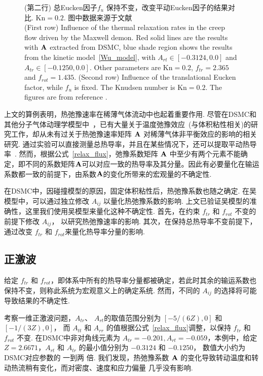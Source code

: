 \begin{figure}[t]
{		(第二行) 	总Eucken因子${f_{u}}$ 保持不变，改变平动Eucken因子的结果对比. $\text{Kn}=0.2$. 图中数据来源于文献\cite{Li2021Uncertainty}\\
		(First row) Influence of the thermal relaxation rates in the creep flow driven by the Maxwell demon. Red solid lines are the results with ${\bf{A}}$ extracted from DSMC, blue shade region shows the results from the kinetic model~\eqref{Wu_model}, with ${A_{rt}}\in[-0.3124,0.0]$ and ${A_{tr}}\in[-0.1250,0.0]$. Other parameters are $\text{Kn}=0.2$, $f_{tr}=2.365$ and $f_{rot}=1.435$. 
		(Second row)  Influence of the translational Eucken factor, while  ${f_{u}}$ is fixed. The Knudsen number is $\text{Kn}=0.2$. The figures are from reference \cite{Li2021Uncertainty}.
	}
	\label{fig:thermalCreep_vary-A}
\end{figure}



上文的算例表明，热弛豫速率在稀薄气体流动中也起着重要作用. 尽管在DSMC和其他分子气体动理学模型中~\cite{Morse1964,holway1966new,Rykov,Gorji2013}，已有大量关于温度弛豫效应~(与体积粘性相关)的研究工作，却从未有过关于热弛豫速率矩阵 $\bf{A}$ 对稀薄气体非平衡效应的影响的相关研究. 通过实验可以直接测量总热导率，并且在某些情况下，还可以提取平动热导率~\cite{Mason1963JCP,gupta1970analysis,porodnov1978thermal,Wu2020JFM}. 然而，根据公式~\eqref{relax_flux}，弛豫系数矩阵 $\bf{A}$ 中至少有两个元素不能确定，即不同的系数矩阵$\bf{A}$可以对应一致的热导率及其分量。因此有必要量化在输运系数都一致的前提下，由系数$\bf{A}$的变化所带来的宏观量的不确定性.


在DSMC中，因碰撞模型的原因，固定体积粘性后，热弛豫系数也随之确定. 在吴模型中，可以通过独立修改 ${A_{ij}}$ 以量化热弛豫系数的影响. 上文已验证吴模型的准确性，这里我们使用吴模型来量化这种不确定性. 首先，在约束 ${f_{tr}}$ 和 ${f_{rot}}$ 不变的前提下修改 ${A_{ij}}$， 以研究热弛豫速率的影响. 其次，在保持总热导率不变前提下，通过改变 ${f_{tr}}$ 和 ${f_{rot}}$来量化热导率分量的影响.



\subsection{正激波}


给定 ${f_{tr}}$ 和 ${f_{rot}}$，即体系中所有的热导率分量都被确定，若此时其余的输运系数也保持不变，则称此系统为宏观意义上的确定系统. 然而，不同的 ${A_{ij}}$  的选择将可能导致结果的不确定性. 

考察一维正激波问题，${A_{tr}}$、 ${A_{rt}}$的取值范围分别为 $ [-5/(6Z),0] $ 和 $[-1/(3Z),0] $， 而 ${A_{tt}}$ 和 ${A_{rr}}$ 的值根据公式~\eqref{relax_flux}调整，以保持 ${f_{tr}}$ 和 ${f_{rot}}$ 不变. 在DSMC中非对角线元素为 $A_{tr}=-0.201, A_{rt}=-0.059$，本例中，给定 ${Z=2.6671}$，${A_{rt}}$ 和 ${A_{tr}}$ 的最小值分别为 $-0.3124$ 和 $-0.1250$， 数值大小约为DSMC对应参数的 一到两 倍. 我们发现，热弛豫系数 ${\bf{A}}$ 的变化导致转动温度和转动热流稍有变化，而对密度、速度和应力偏量 几乎没有影响.


